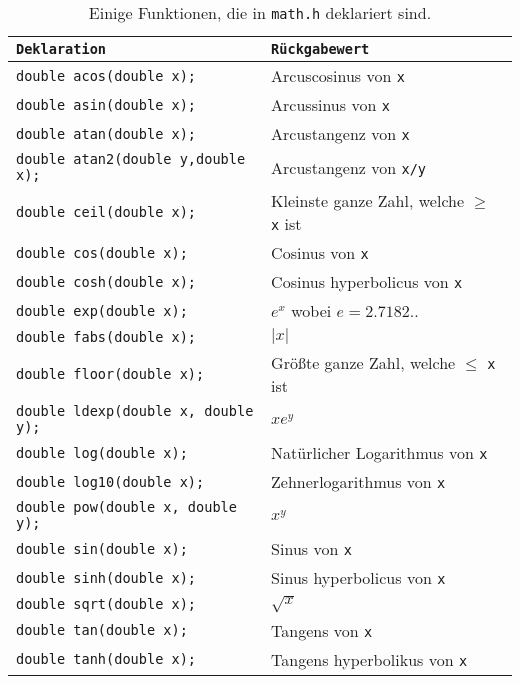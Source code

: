 \begin{table}
  \centering
  \begin{tabular}{|l l|}
    \hline
    \texttt{Deklaration} & \texttt{Rückgabewert} \\
    \hline
    \texttt{double acos(double x);} & Arcuscosinus von \texttt{x}\\
    \texttt{double asin(double x);} & Arcussinus von \texttt{x}\\
    \texttt{double atan(double x);} & Arcustangenz von \texttt{x}\\
    \texttt{double atan2(double y,double x);} & Arcustangenz von \texttt{x/y}\\
    \texttt{double ceil(double x);} & Kleinste ganze Zahl, welche $\ge$ \texttt{x} ist \\
    \texttt{double cos(double x);} & Cosinus von \texttt{x}\\
    \texttt{double cosh(double x);} & Cosinus hyperbolicus von \texttt{x}\\
    \texttt{double exp(double x);} & $e^{x}$ wobei $e=2.7182..$\\
    \texttt{double fabs(double x);} & $\vert x\vert$\\
    \texttt{double floor(double x);} & Größte ganze Zahl, welche $\le$ \texttt{x} ist \\
    \texttt{double ldexp(double x, double y);} & $xe^{y}$ \\
    \texttt{double log(double x);} & Natürlicher Logarithmus von \texttt{x}\\
    \texttt{double log10(double x);} & Zehnerlogarithmus von \texttt{x}\\
    \texttt{double pow(double x, double y);} & $x^{y}$\\
    \texttt{double sin(double x);} & Sinus von \texttt{x}\\
    \texttt{double sinh(double x);} & Sinus hyperbolicus von \texttt{x}\\
    \texttt{double sqrt(double x);} & $\sqrt{x}$\\
    \texttt{double tan(double x);} & Tangens von \texttt{x}\\
    \texttt{double tanh(double x);} & Tangens hyperbolikus von \texttt{x}\\
    \hline
  \end{tabular}
  \caption{Einige Funktionen, die in \texttt{math.h} deklariert sind.\label{math}}
\end{table}
